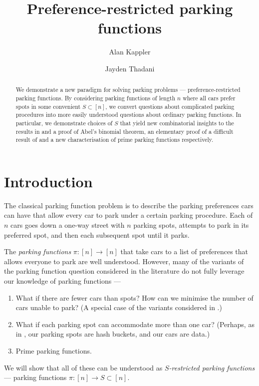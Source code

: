 \documentclass[12 pt]{amsart}
\title{Preference-restricted parking functions}
\author[Kappler]{Alan Kappler}
\author[Thadani]{Jayden Thadani}
\theoremstyle{definition} %
\theoremstyle{remark} %
\begin{document}
	

\begin{abstract}
	We demonstrate a new paradigm for solving parking problems --- preference-restricted parking functions. By considering parking functions of length $n$ where all cars prefer spots in some convenient $S \subset [n]$, we convert questions about complicated parking procedures into more easily understood questions about ordinary parking functions. In particular, we demonstrate choices of $S$ that yield new combinatorial insights to the results in \cite{cameron-johannsen-prellberg-schweitzer-2008} and a proof of Abel's binomial theorem, an elementary proof of a difficult result of \cite{blake-konheim-1977} and a new characterisation of prime parking functions respectively.
\end{abstract}

\maketitle

\pagebreak

\tableofcontents

\pagebreak

\makeatletter
\providecommand\@dotsep{5}
\makeatother
\listoftodos\relax

\pagebreak

\section{Introduction}

The classical parking function problem is to describe the parking preferences cars can have that allow every car to park under a certain parking procedure. Each of $n$ cars goes down a one-way street with $n$ parking spots, attempts to park in its preferred spot, and then each subsequent spot until it parks.

The \emph{parking functions} $\pi : [n] \to [n]$ that take cars to a list of preferences that allows everyone to park are well understood. However, many of the variants of the parking function question considered in the literature do not fully leverage our knowledge of parking functions ---
\begin{enumerate}
	\item What if there are fewer cars than spots? How can we minimise the number of cars unable to park? (A special case of the variants considered in \cite{cameron-johannsen-prellberg-schweitzer-2008}.)
	\item What if each parking spot can accommodate more than one car? (Perhaps, as in \cite{blake-konheim-1977}, our parking spots are hash buckets, and our cars are data.)
	\item Prime parking functions.
\end{enumerate}
We will show that all of these can be understood as \emph{$S$-restricted parking functions} --- parking functions $\pi : [n] \to S \subset [n]$. 
\end{document}
